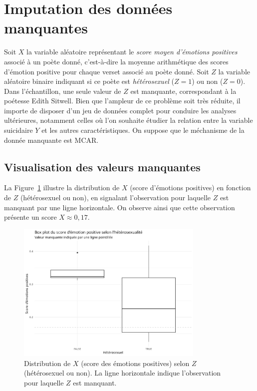 \section{Imputation des données manquantes}
\label{sec:imputation-missing}

Soit \(X\) la variable aléatoire représentant le \emph{score moyen d’émotions positives} associé à un poète donné, c'est-à-dire la moyenne arithmétique des scores d'émotion positive pour chaque verset associé au poète donné. Soit \(Z\) la variable aléatoire binaire indiquant si ce poète est \emph{hétérosexuel} (\(Z=1\)) ou non (\(Z=0\)). Dans l’échantillon, une seule valeur de \(Z\) est manquante, correspondant à la poétesse Edith Sitwell. Bien que l’ampleur de ce problème soit très réduite, il importe de disposer d’un jeu de données complet pour conduire les analyses ultérieures, notamment celles où l’on souhaite étudier la relation entre la variable suicidaire \(Y\) et les autres caractéristiques. On suppose que le méchanisme de la donnée manquante est MCAR.

\subsection{Visualisation des valeurs manquantes}
La Figure~\ref{fig:boxplot-imputation} illustre la distribution de \(X\) (score d’émotions positives) en fonction de \(Z\) (hétérosexuel ou non), en signalant l’observation pour laquelle \(Z\) est manquant par une ligne horizontale. On observe ainsi que cette observation présente un score \(X\approx 0{,}17\). 

\begin{figure}[H]
	\centering
	\includegraphics[width=0.8\textwidth]{images/boxplot-positive-heterosexual-missing-values.png}
	\caption{Distribution de \(X\) (score des émotions positives) selon \(Z\) (hétérosexuel ou non). La ligne horizontale indique l’observation pour laquelle \(Z\) est manquant.}
	\label{fig:boxplot-imputation}
\end{figure}

